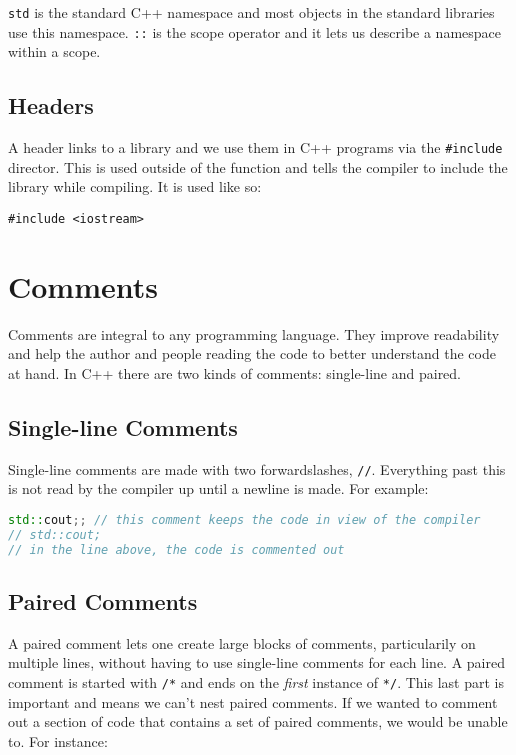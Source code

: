 \documentclass[12pt, a4paper]{report}
\begin{document}
\verb|std| is the standard C++ namespace and most objects in the standard libraries use this namespace. \verb|::| is the scope operator and it lets us describe a namespace within a scope.

\subsection{Headers}
A header links to a library and we use them in C++ programs via the \verb|#include| director. This is used outside of the function and tells the compiler to include the library while compiling. It is used like so:

\begin{center}
	\verb|#include <iostream>|
\end{center}
\section{Comments}
Comments are integral to any programming language. They improve readability and help the author and people reading the code to better understand the code at hand.
In C++ there are two kinds of comments: single-line and paired.
\subsection{Single-line Comments}
Single-line comments are made with two forwardslashes, \verb|//|. Everything past this is not read by the compiler up until a newline is made. For example:

\begin{scriptsize}
\begin{lstlisting}[language=C++]
std::cout;; // this comment keeps the code in view of the compiler
// std::cout;
// in the line above, the code is commented out
\end{lstlisting}
\end{scriptsize}

\subsection{Paired Comments}
A paired comment lets one create large blocks of comments, particularily on multiple lines, without having to use single-line comments for each line.
A paired comment is started with \verb|/*| and ends on the \emph{first} instance of \verb|*/|. This last part is important and means we can't nest paired comments.
If we wanted to comment out a section of code that contains a set of paired comments, we would be unable to. For instance:
\end{document}
